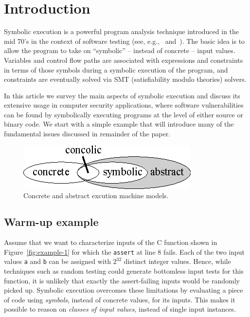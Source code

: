 
\section{Introduction}

Symbolic execution is a powerful program analysis technique introduced in the mid 70's in the context of software testing (see, e.g.,~{\cite{K-CACM76} and~\cite{H-TSE77}}). The basic idea is to allow the program to take on ``symbolic'' -- instead of concrete -- input values. Variables and control flow paths are associated with expressions and constraints in terms of those symbols during a symbolic execution of the program, and constraints are eventually solved via SMT (satisfiability modulo theories) solvers.

In this article we survey the main aspects of symbolic execution and discuss its extensive usage in computer security applications, where software vulnerabilities can be found by symbolically executing programs at the level of either source or binary code.
We start with a simple example that will introduce many of the fundamental issues discussed in remainder of the paper.

\begin{figure}[t]
\centering
\includegraphics[width=0.35\columnwidth]{images/concrete-abstract.eps} 
\caption{Concrete and abstract excution machine models.}
\label{fig:concrete-symbolic}
\end{figure}

\subsection{Warm-up example}
\label{symbolic-execution-example}

Assume that we want to characterize inputs of the C function shown in Figure~\ref{fig:example-1} for which the {\tt assert} at line 8 fails. Each of the two input values {\tt a} and {\tt b} can be assigned with $2^{32}$ distinct integer values. Hence, while techniques such as random testing could generate bottomless input tests for this function, it is unlikely that exactly the assert-failing inputs would be randomly picked up. 
Symbolic execution overcomes these limitations by evaluating a piece of code using {\em symbols}, instead of concrete values, for its inputs. This makes it possible to reason on {\em classes of input values}, instead of single input instances. 

